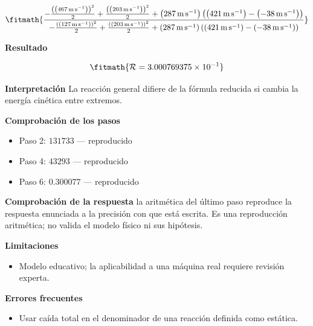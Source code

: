 \documentclass[10pt,openany]{book}
\begin{document}
\begin{tcolorbox}[title={Problema resuelto 2}, studiumworked, breakable]
\[
\fitmath{\frac{- \frac{\left(\left(467\,\mathrm{m}\,\mathrm{s}^{-1}\right)\right)^{2}}{2} + \frac{\left(\left(203\,\mathrm{m}\,\mathrm{s}^{-1}\right)\right)^{2}}{2} + \left(287\,\mathrm{m}\,\mathrm{s}^{-1}\right) \left(\left(421\,\mathrm{m}\,\mathrm{s}^{-1}\right) - \left(-38\,\mathrm{m}\,\mathrm{s}^{-1}\right)\right)}{- \frac{\left(\left(127\,\mathrm{m}\,\mathrm{s}^{-1}\right)\right)^{2}}{2} + \frac{\left(\left(203\,\mathrm{m}\,\mathrm{s}^{-1}\right)\right)^{2}}{2} + \left(287\,\mathrm{m}\,\mathrm{s}^{-1}\right) \left(\left(421\,\mathrm{m}\,\mathrm{s}^{-1}\right) - \left(-38\,\mathrm{m}\,\mathrm{s}^{-1}\right)\right)}}
\]

\noindent\textbf{Resultado}

\[
\fitmath{\mathcal R=3.000769375\times10^{-1}}
\]

\noindent\textbf{Interpretación}
La reacción general difiere de la fórmula reducida si cambia la energía cinética entre extremos.

\noindent\textbf{Comprobación de los pasos}
\begin{itemize}
\item Paso 2: $131733$ — reproducido
\item Paso 4: $43293$ — reproducido
\item Paso 6: $0.300077$ — reproducido
\end{itemize}

\noindent\textbf{Comprobación de la respuesta} la aritmética del último paso reproduce la respuesta enunciada a la precisión con que está escrita. Es una reproducción aritmética; no valida el modelo físico ni sus hipótesis.

\noindent\textbf{Limitaciones}
\begin{itemize}
\item Modelo educativo; la aplicabilidad a una máquina real requiere revisión experta.
\end{itemize}

\noindent\textbf{Errores frecuentes}
\begin{itemize}
\item Usar caída total en el denominador de una reacción definida como estática.
\end{itemize}
\end{tcolorbox}
\end{document}
